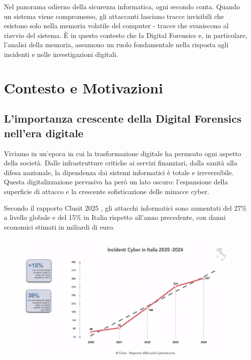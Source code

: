 
Nel panorama odierno della sicurezza informatica, ogni secondo conta. Quando un sistema viene compromesso, gli attaccanti lasciano tracce invisibili che esistono solo nella memoria volatile del computer - tracce che svaniscono al riavvio del sistema. È in questo contesto che la Digital Forensics e, in particolare, l'analisi della memoria, assumono un ruolo fondamentale nella risposta agli incidenti e nelle investigazioni digitali.

\section{Contesto e Motivazioni}

\subsection{L'importanza crescente della Digital Forensics nell'era digitale}

Viviamo in un'epoca in cui la trasformazione digitale ha permeato ogni aspetto della società. Dalle infrastrutture critiche ai servizi finanziari, dalla sanità alla difesa nazionale, la dipendenza dai sistemi informatici è totale e irreversibile. Questa digitalizzazione pervasiva ha però un lato oscuro: l'espansione della superficie di attacco e la crescente sofisticazione delle minacce cyber.

Secondo il rapporto Clusit 2025 \cite{clusit2025}, gli attacchi informatici sono aumentati del 27\% a livello globale e del 15\% in Italia rispetto all'anno precedente, con danni economici stimati in miliardi di euro.

\begin{figure}[H]
    \centering
    \includegraphics[width=1\linewidth]{images/intro/clusit-ita.png}
\end{figure}

